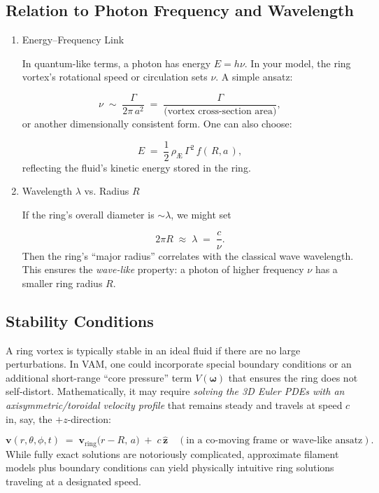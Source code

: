 \subsection{Relation to Photon Frequency and Wavelength}

\begin{enumerate}

    \item
    Energy–Frequency Link

    In quantum-like terms, a photon has energy $E=h\nu$. In your model, the ring vortex’s rotational speed or circulation sets $\nu$. A simple ansatz:

    $$ \nu \;\sim\; \frac{\Gamma}{2\pi\,a^2} \;=\; \frac{\Gamma}{\text{(vortex cross-section area)}}, $$
    or another dimensionally consistent form. One can also choose:

    $$ E \;=\; \frac{1}{2}\,\rho_{\scriptscriptstyle \mathrm{Æ}}\,\Gamma^2\,f(\,R,a\,), $$
    reflecting the fluid’s kinetic energy stored in the ring.

    \item
    Wavelength $\lambda$ vs. Radius $R$

    If the ring’s overall diameter is $\sim \lambda$, we might set

    $$ 2\pi R \;\approx\; \lambda \;=\; \frac{c}{\nu}. $$
    Then the ring’s “major radius” correlates with the classical wave wavelength. This ensures the \textit{wave-like} property: a photon of higher frequency $\nu$ has a smaller ring radius $R$.

\end{enumerate}

\subsection{Stability Conditions}

A ring vortex is typically stable in an ideal fluid if there are no large perturbations. In VAM, one could incorporate special boundary conditions or an additional short-range “core pressure” term $V(\boldsymbol{\omega})$ that ensures the ring does not self-distort. Mathematically, it may require \textit{solving the 3D Euler PDEs with an axisymmetric/toroidal velocity profile} that remains steady and travels at speed $c$ in, say, the $+z$-direction:

$$
\mathbf{v}(r,\theta,\phi, t)
\;=\;
\mathbf{v}_{\text{ring}}\bigl(r - R,\,a\bigr)
\;+\;
c\,\hat{\mathbf{z}}
\quad
(\text{in a co-moving frame or wave-like ansatz}).
$$
While fully exact solutions are notoriously complicated, approximate filament models plus boundary conditions can yield physically intuitive ring solutions traveling at a designated speed.

